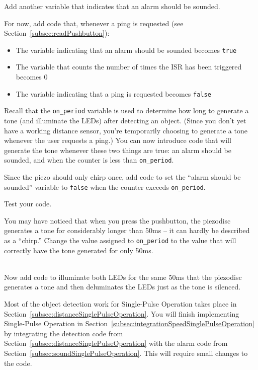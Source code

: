 Add another variable that indicates that an alarm should be sounded.

For now, add code that, whenever a ping is requested (see Section~\ref{subsec:readPushbutton}):
\begin{itemize}
    \item The variable indicating that an alarm should be sounded becomes \lstinline{true}
    \item The variable that counts the number of times the ISR has been triggered becomes 0
    \item The variable indicating that a ping is requested becomes \lstinline{false}
\end{itemize}

Recall that the \lstinline{on_period} variable is used to determine how long to generate a tone (and illuminate the LEDs) after detecting an object.
(Since you don't yet have a working distance sensor, you're temporarily choosing to generate a tone whenever the user requests a ping.)
You can now introduce code that will generate the tone whenever these two things are true: an alarm should be sounded, and when the counter is less than \lstinline{on_period}.

Since the piezo should only chirp once, add code to set the ``alarm should be sounded'' variable to \lstinline{false} when the counter exceeds \lstinline{on_period}.

\vspace{.5cm}

Test your code.

\vspace{.5cm}

You may have noticed that when you press the pushbutton, the piezodisc generates a tone for considerably longer than 50ms -- it can hardly be described as a ``chirp.''
Change the value assigned to \lstinline{on_period} to the value that will correctly have the tone generated for only 50ms.

 \\

Now add code to illuminate both LEDs for the same 50ms that the piezodisc generates a tone and then deluminates the LEDs just as the tone is silenced.

\vspace{.5cm}

Most of the object detection work for Single-Pulse Operation takes place in Section~\ref{subsec:distanceSinglePulseOperation}.
You will finish implementing Single-Pulse Operation in Section~\ref{subsec:integrationSpeedSinglePulseOperation} by integrating the detection code from Section~\ref{subsec:distanceSinglePulseOperation} with the alarm code from Section~\ref{subsec:soundSinglePulseOperation}.
This will require small changes to the code.
